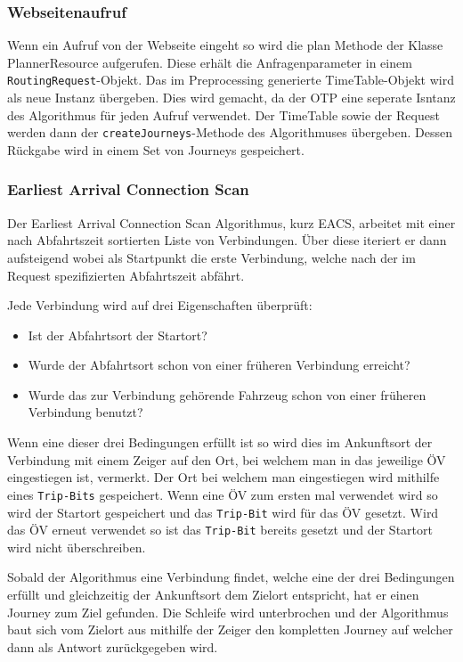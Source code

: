 \subsubsection{Webseitenaufruf}
Wenn ein Aufruf von der Webseite eingeht so wird die plan Methode der Klasse PlannerResource aufgerufen. Diese erhält die Anfragenparameter in einem \texttt{RoutingRequest}-Objekt. Das im Preprocessing generierte TimeTable-Objekt wird als neue Instanz übergeben. Dies wird gemacht, da der OTP eine seperate Isntanz des Algorithmus für jeden Aufruf verwendet. Der TimeTable sowie der Request werden dann der \texttt{createJourneys}-Methode des Algorithmuses übergeben. Dessen Rückgabe wird in einem Set von Journeys gespeichert.


\subsubsection{Earliest Arrival Connection Scan}
Der Earliest Arrival Connection Scan Algorithmus\cite{csa}, kurz EACS, arbeitet mit einer nach Abfahrtszeit sortierten Liste von Verbindungen. Über diese iteriert er dann aufsteigend wobei als Startpunkt die erste Verbindung, welche nach der im Request spezifizierten Abfahrtszeit abfährt. 

Jede Verbindung wird auf drei Eigenschaften überprüft:
\begin{itemize}
	\item Ist der Abfahrtsort der Startort?
	\item Wurde der Abfahrtsort schon von einer früheren Verbindung erreicht?
	\item Wurde das zur Verbindung gehörende Fahrzeug schon von einer früheren Verbindung benutzt?
\end{itemize}
Wenn eine dieser drei Bedingungen erfüllt ist so wird dies im Ankunftsort der Verbindung mit einem Zeiger auf den Ort, bei welchem man in das jeweilige ÖV eingestiegen ist, vermerkt. Der Ort bei welchem man eingestiegen wird mithilfe eines \texttt{Trip-Bits} gespeichert. Wenn eine ÖV zum ersten mal verwendet wird so wird der Startort gespeichert und das \texttt{Trip-Bit} wird für das ÖV gesetzt. Wird das ÖV erneut verwendet so ist das \texttt{Trip-Bit} bereits gesetzt und der Startort wird nicht überschreiben. 

Sobald der Algorithmus eine Verbindung findet, welche eine der drei Bedingungen erfüllt und gleichzeitig der Ankunftsort dem Zielort entspricht, hat er einen Journey zum Ziel gefunden. Die Schleife wird unterbrochen und der Algorithmus baut sich vom Zielort aus mithilfe der Zeiger den kompletten Journey auf welcher dann als Antwort zurückgegeben wird.

